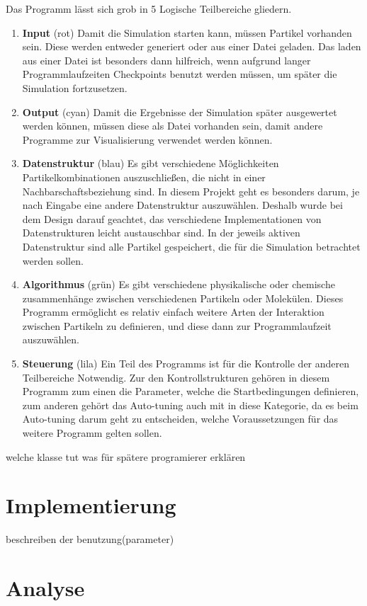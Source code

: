 \documentclass[
	12pt,
	a4paper,
	BCOR10mm,
	DIV14,
	headsepline,
]{scrreprt}
\begin{document}
Das Programm lässt sich grob in 5 Logische Teilbereiche gliedern.
\begin{enumerate}
	\item \textbf{Input} (rot) Damit die Simulation starten kann, müssen Partikel vorhanden sein. Diese werden entweder generiert oder aus einer Datei geladen. Das laden aus einer Datei ist besonders dann hilfreich, wenn aufgrund langer Programmlaufzeiten Checkpoints benutzt werden müssen, um später die Simulation fortzusetzen.
	\item \textbf{Output} (cyan) Damit die Ergebnisse der Simulation später ausgewertet werden können, müssen diese als Datei vorhanden sein, damit andere Programme zur Visualisierung verwendet werden können.
	\item \textbf{Datenstruktur} (blau) Es gibt verschiedene Möglichkeiten Partikelkombinationen auszuschließen, die nicht in einer Nachbarschaftsbeziehung sind. In diesem Projekt geht es besonders darum, je nach Eingabe eine andere Datenstruktur auszuwählen. Deshalb wurde bei dem Design darauf geachtet, das verschiedene Implementationen von Datenstrukturen leicht austauschbar sind. In der jeweils aktiven Datenstruktur sind alle Partikel gespeichert, die für die Simulation betrachtet werden sollen.
	\item \textbf{Algorithmus} (grün) Es gibt verschiedene physikalische oder chemische zusammenhänge zwischen verschiedenen Partikeln oder Molekülen. Dieses Programm ermöglicht es relativ einfach weitere Arten der Interaktion zwischen Partikeln zu definieren, und diese dann zur Programmlaufzeit auszuwählen.
	\item \textbf{Steuerung} (lila) Ein Teil des Programms ist für die Kontrolle der anderen Teilbereiche Notwendig. Zur den Kontrollstrukturen gehören in diesem Programm zum einen die Parameter, welche die Startbedingungen definieren, zum anderen gehört das Auto-tuning auch mit in diese Kategorie, da es beim Auto-tuning darum geht zu entscheiden, welche Voraussetzungen für das weitere Programm gelten sollen.
\end{enumerate}
welche klasse tut was
für spätere programierer erklären

\section{Implementierung}

beschreiben der benutzung(parameter)

\section{Analyse}
\end{document}
